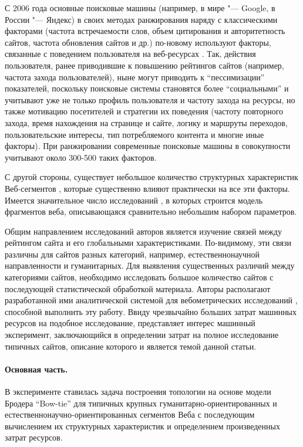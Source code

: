 С 2006 года основные поисковые машины (например, в мире "--- Google, в России "--- Яндекс) в своих методах ранжирования наряду с классическими факторами \cite{Kleinberg, BrinPage, Chakrabarti} (частота встречаемости слов, объем цитирования и авторитетность сайтов, частота обновления сайтов и др.) по-новому используют факторы, связанные с поведением пользователя на веб-ресурсах \cite{GuhaKunduBhadra,AntoniouPlegasTsakalidis,FeuerSavevAslam}. Так, действия пользователя, ранее приводившие к повышению рейтингов сайтов (например, частота захода пользователей), ныне могут приводить к “пессимизации” показателей, поскольку поисковые системы становятся более “социальными” и учитывают уже не только профиль пользователя и частоту захода на ресурсы, но также мотивацию посетителей и стратегии их поведения (частоту повторного захода, время нахождения на странице и сайте, логику и маршруты переходов, пользовательские интересы, тип потребляемого контента и многие иные факторы). При ранжировании современные поисковые машины в совокупности учитывают около 300-500 таких факторов.

С другой стороны, существует небольшое количество структурных характеристик Веб-сегментов \cite{ChoRoy}, которые существенно влияют практически на все эти факторы. Имеется значительное число исследований \cite{Kleinberg,ChoRoy,BroderKumarMaghoul,AguilloGranadinoOrtega,StuartThelwallHarries,Chakrabarti,Thelwall,Pechnikov,PechnikovNwohiri}, в которых строится модель фрагментов веба, описывающаяся сравнительно небольшим набором параметров.

Общим направлением исследований авторов является изучение связей между рейтингом сайта и его глобальными характеристиками. По-видимому, эти связи различны для сайтов разных категорий, например, естественнонаучной направленности и гуманитарных. Для выявления существенных различий между категориями сайтов, необходимо исследовать большое количество сайтов с последующей статистической обработкой материала. Авторы располагают разработанной ими аналитической системой для вебометрических исследований \cite{BlekanovSergeevMaksimov,BlekanovSergeevMartynenko}, способной выполнить эту работу. Ввиду чрезвычайно больших затрат машинных ресурсов на подобное исследование, представляет интерес машинный эксперимент, заключающийся в определении затрат на полное исследование типичных сайтов, описание которого и является темой данной статьи.

\paragraph{Основная часть.} В эксперименте ставилась задача построения топологии на основе модели Бродера “Bow-tie” \cite{BroderKumarMaghoul,Thelwall} для типичных крупных гуманитарно-ориентированных и естественнонаучно-ориентированных сегментов Веба с последующим вычислением их структурных характеристик и определением произведенных затрат ресурсов.

